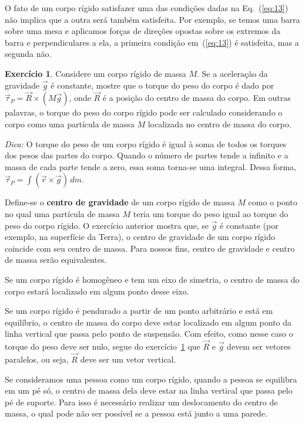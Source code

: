 \documentclass[papersize=a4,DIV=calc,twocolumn=on]{scrartcl}
\theoremstyle{definition}
\newtheorem{ex}{Exercício}[section]
\begin{document}
O fato de um corpo rígido satisfazer uma das condições dadas na
Eq.~(\ref{eq:13}) não implica que a outra será também satisfeita. Por
exemplo, se temos uma barra sobre uma mesa e aplicamos forças de
direções opostas sobre os extremos da barra e perpendiculares a ela, a
primeira condição em~(\ref{eq:13}) é satisfeita, mas a segunda não.

\begin{ex}
  \label{ex:1}
  Considere um corpo rígido de massa $M$. Se a aceleração da gravidade
  $\vec g$ é constante, mostre que o torque do peso do corpo é dado
  por $\vec\tau_P=\vec R\times(M\vec g)$, onde $\vec R$ é a posição do
  centro de massa do corpo. Em outras palavras, o torque do peso do
  corpo rígido pode ser calculado considerando o corpo como uma
  partícula de massa $M$ localizada no centro de massa do corpo.

  \noindent\textit{Dica:} O torque do peso de um corpo rígido é igual
  à soma de todos os torques dos pesos das partes do corpo. Quando o
  número de partes tende a infinito e a massa de cada parte tende a
  zero, essa soma torna-se uma integral. Dessa forma,
  $\vec\tau_P=\int (\vec r\times\vec g)\,dm$.
\end{ex}

Define-se o \textbf{centro de gravidade} de um corpo rígido de massa
$M$ como o ponto no qual uma partícula de massa $M$ teria um torque do
peso igual ao torque do peso do corpo rígido. O exercício anterior
mostra que, se $\vec g$ é constante (por exemplo, na superfície da
Terra), o centro de gravidade de um corpo rígido coincide com seu
centro de massa. Para nossos fins, centro de gravidade e centro de
massa serão equivalentes.

Se um corpo rígido é homogêneo e tem um eixo de simetria, o centro de
massa do corpo estará localizado em algum ponto desse eixo.

Se um corpo rígido é pendurado a partir de um ponto arbitrário e está
em equilíbrio, o centro de massa do corpo deve estar localizado em
algum ponto da linha vertical que passa pelo ponto de suspensão. Com
efeito, como nesse caso o torque do peso deve ser nulo, segue do
exercício~\ref{ex:1} que $\vec R$ e $\vec g$ devem ser vetores
paralelos, ou seja, $\vec R$ deve ser um vetor vertical.

Se consideramos uma pessoa como um corpo rígido, quando a pessoa se
equilibra em um pé só, o centro de massa dela deve estar na linha
vertical que passa pelo pé de suporte. Para isso é necessário realizar
um deslocamento do centro de massa, o qual pode não ser possível se a
pessoa está junto a uma parede.
\end{document}
